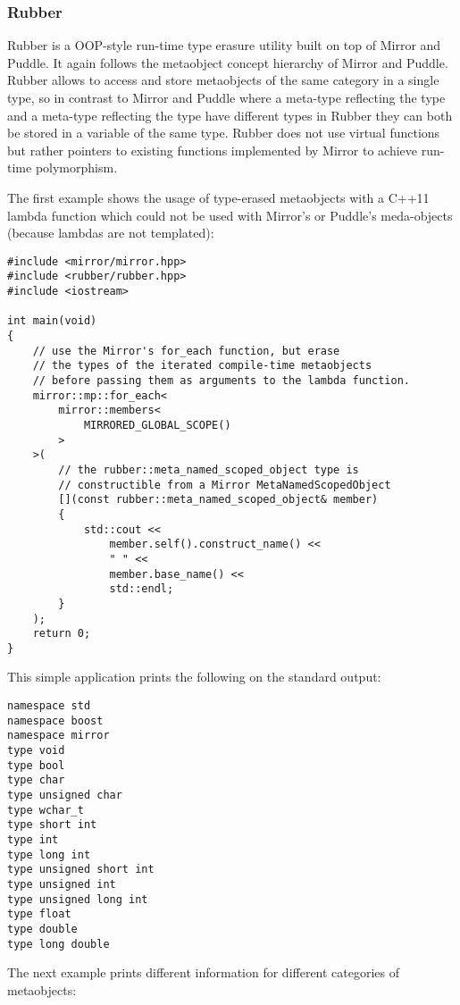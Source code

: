 \subsubsection{Rubber}

Rubber is a OOP-style run-time type erasure utility built on top
of Mirror and Puddle. It again follows the metaobject concept hierarchy of Mirror and Puddle.
Rubber allows to access and store metaobjects of the same category in a single
type, so in contrast to Mirror and Puddle where a meta-type reflecting the \verb@int@
type and a meta-type reflecting the \verb@double@ type have different types
in Rubber they can both be stored in a variable of the same type.
Rubber does not use virtual functions but rather pointers to existing
functions implemented by Mirror to achieve run-time polymorphism.

The first example shows the usage of type-erased metaobjects with a C++11
lambda function which could not be used with Mirror's or Puddle's meda-objects
(because lambdas are not templated):

\begin{verbatim}
#include <mirror/mirror.hpp>
#include <rubber/rubber.hpp>
#include <iostream>

int main(void)
{
    // use the Mirror's for_each function, but erase
    // the types of the iterated compile-time metaobjects
    // before passing them as arguments to the lambda function.
    mirror::mp::for_each<
        mirror::members<
            MIRRORED_GLOBAL_SCOPE()
        >
    >(
        // the rubber::meta_named_scoped_object type is
        // constructible from a Mirror MetaNamedScopedObject
        [](const rubber::meta_named_scoped_object& member)
        {
            std::cout <<
                member.self().construct_name() <<
                " " <<
                member.base_name() <<
                std::endl;
        }
    );
    return 0;
}
\end{verbatim}

This simple application prints the following on the standard output:

\begin{verbatim}
namespace std
namespace boost
namespace mirror
type void
type bool
type char
type unsigned char
type wchar_t
type short int
type int
type long int
type unsigned short int
type unsigned int
type unsigned long int
type float
type double
type long double
\end{verbatim}

The next example prints different information for different categories
of metaobjects:

